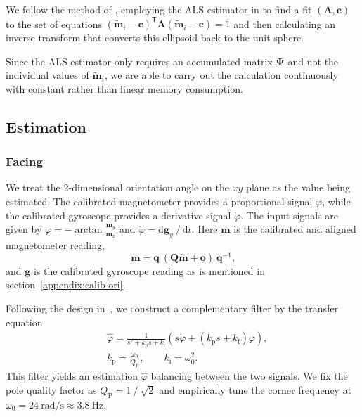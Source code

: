 \documentclass{nime-alternate} %
\begin{document}
We follow the method of \cite{Renaudin2010}, employing the ALS estimator in \cite{Markovsky_2004_ALS} to find a fit $(\mathbf{A}, \mathbf{c})$ to the set of equations
$(\tilde{\mathbf{m}}_i - \mathbf{c})^\mathsf{T} \mathbf{A} (\tilde{\mathbf{m}}_i - \mathbf{c}) = 1$
and then calculating an inverse transform that converts this ellipsoid back to the unit sphere.

Since the ALS estimator only requires an accumulated matrix $\mathbf{\Psi}$ and not the individual values of $\tilde{\mathbf{m}}_i$, we are able to carry out the calculation continuously with constant rather than linear memory consumption.

\subsection{Estimation}
\subsubsection{Facing}
\label{appendix:est-facing}
We treat the 2-dimensional orientation angle on the $xy$ plane as the value being estimated. The calibrated magnetometer provides a proportional signal $\varphi$, while the calibrated gyroscope provides a derivative signal $\dot\varphi$.
The input signals are given by $\varphi = -\mathop{\mathrm{arctan}} \frac {\mathbf{m}_y} {\mathbf{m}_x}$ and $\dot\varphi = \mathrm{d}{\mathbf{g}_y} \mathbin{\mathop{/}} \mathrm{d}t$. Here $\mathbf{m}$ is the calibrated and aligned magnetometer reading,
\begin{equation*}\label{eqn:est-facing}
\mathbf{m} = \mathbf{q} \ (\mathbf{Q}\tilde{\mathbf{m}} + \mathbf{o}) \ \mathbf{q}^{-1}\text{,}
\end{equation*}
and $\mathbf{g}$ is the calibrated gyroscope reading as is mentioned in section~\ref{appendix:calib-ori}.

Following the design in~\cite{Min_Complementary}, we construct a complementary filter by the transfer equation
\begin{equation*}
\begin{split}
& \hat{\varphi} = \frac 1 {s^2 + k_\mathrm{p} s + k_\mathrm{i}} \left( s \dot\varphi + (k_\mathrm{p} s + k_\mathrm{i}) \varphi \right) \text{,} \\
& k_\mathrm{p} = \frac {\omega_0} {Q_\mathrm{P}},\qquad k_\mathrm{i} = \omega_0^2\text{.}
\end{split}
\end{equation*}
This filter yields an estimation $\hat{\varphi}$ balancing between the two signals.
We fix the pole quality factor as $Q_\mathrm{P} = 1 \mathbin{\mathop{/}} \sqrt{2}$ and empirically tune the corner frequency at $\omega_0 = 24\ \text{rad/s} \approx 3.8\ \text{Hz}$.
\end{document}
